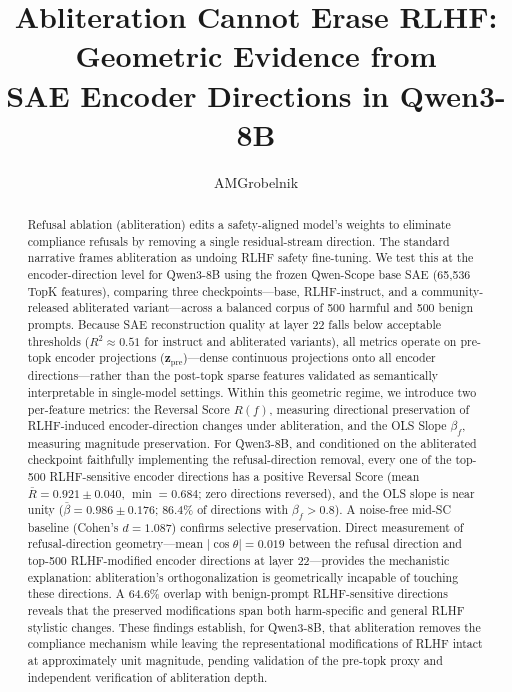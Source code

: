 \documentclass[11pt,letterpaper]{article}
\title{\textbf{Abliteration Cannot Erase RLHF: Geometric Evidence from\\
SAE Encoder Directions in Qwen3-8B}}
\author{AMGrobelnik}
\date{}
\begin{document}
\maketitle

\begin{abstract}
Refusal ablation (abliteration) edits a safety-aligned model's weights to eliminate compliance
refusals by removing a single residual-stream direction. The standard narrative frames abliteration
as undoing RLHF safety fine-tuning. We test this at the encoder-direction level for Qwen3-8B using
the frozen Qwen-Scope base SAE (65,536 TopK features), comparing three checkpoints---base,
RLHF-instruct, and a community-released abliterated variant---across a balanced corpus of 500 harmful
and 500 benign prompts. Because SAE reconstruction quality at layer 22 falls below acceptable
thresholds ($R^2 \approx 0.51$ for instruct and abliterated variants), all metrics operate on
pre-topk encoder projections ($\mathbf{z}_{\text{pre}}$)---dense continuous projections onto all
encoder directions---rather than the post-topk sparse features validated as semantically interpretable
in single-model settings. Within this geometric regime, we introduce two per-feature metrics: the
Reversal Score $R(f)$, measuring directional preservation of RLHF-induced encoder-direction changes
under abliteration, and the OLS Slope $\beta_f$, measuring magnitude preservation. For Qwen3-8B,
and conditioned on the abliterated checkpoint faithfully implementing the refusal-direction removal,
every one of the top-500 RLHF-sensitive encoder directions has a positive Reversal Score
(mean $\bar{R} = 0.921 \pm 0.040$, $\min = 0.684$; zero directions reversed), and the OLS slope
is near unity ($\bar{\beta} = 0.986 \pm 0.176$; 86.4\% of directions with $\beta_f > 0.8$). A
noise-free mid-SC baseline (Cohen's $d = 1.087$) confirms selective preservation. Direct measurement
of refusal-direction geometry---mean $|\cos\theta| = 0.019$ between the refusal direction and
top-500 RLHF-modified encoder directions at layer 22---provides the mechanistic explanation:
abliteration's orthogonalization is geometrically incapable of touching these directions. A 64.6\%
overlap with benign-prompt RLHF-sensitive directions reveals that the preserved modifications span
both harm-specific and general RLHF stylistic changes. These findings establish, for Qwen3-8B, that
abliteration removes the compliance mechanism while leaving the representational modifications of
RLHF intact at approximately unit magnitude, pending validation of the pre-topk proxy and independent
verification of abliteration depth.
\end{abstract}
\end{document}

